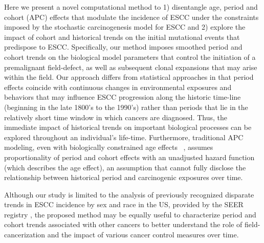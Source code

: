 \documentclass[10pt,letterpaper]{article}
\begin{document}
Here we present a novel computational method to 1) disentangle age, period and cohort (APC) effects that modulate the incidence of ESCC under the constraints imposed by the stochastic carcinogenesis model for ESCC and 2) explore the impact of cohort and historical trends on the initial mutational events that predispose to ESCC. Specifically, our method imposes smoothed period and cohort trends on the biological model parameters that control the initiation of a premalignant field-defect, as well as subsequent clonal expansions that may arise within the field. Our approach differs from statistical approaches in that period effects coincide with continuous changes in environmental exposures and behaviors that may influence ESCC progression along the historic time-line (beginning in the late 1800's to the 1990's) rather than periods that lie in the relatively short time window in which cancers are diagnosed. Thus, the immediate impact of historical trends on important biological processes can be explored throughout an individual's life-time. Furthermore, traditional APC modeling, even with biologically constrained age effects ~\cite{Holford1991, Luebeck2002, Jeon2006, Meza2008}, assumes proportionality of period and cohort effects with an unadjusted hazard function (which describes the age effect), an assumption that cannot fully disclose the relationship between historical period and carcinogenic exposures over time. 

Although our study is limited to the analysis of previously recognized disparate trends in ESCC incidence by sex and race in the US, provided by the SEER registry \cite{SEER2019}, the proposed method may be equally useful to characterize period and cohort trends associated with other cancers to better understand the role of field-cancerization and the impact of various cancer control measures over time. 
\end{document}
